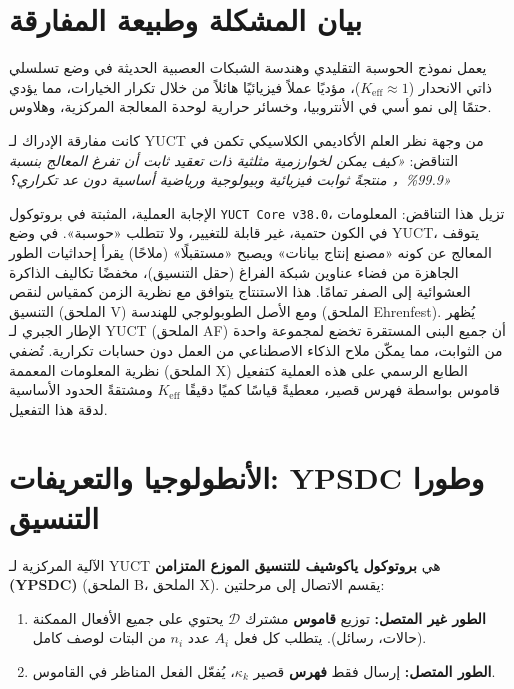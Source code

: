 \documentclass[12pt,a4paper]{article}
\begin{document}
	\newpage
	\tableofcontents
	\newpage
	\small
	\section{بيان المشكلة وطبيعة المفارقة}
	يعمل نموذج الحوسبة التقليدي وهندسة الشبكات العصبية الحديثة في وضع تسلسلي ذاتي الانحدار (\(K_{\text{eff}} \approx 1\))، مؤديًا عملاً فيزيائيًا هائلاً من خلال تكرار الخيارات، مما يؤدي حتمًا إلى نمو أسي في الأنتروبيا، وخسائر حرارية لوحدة المعالجة المركزية، وهلاوس.
	
	كانت مفارقة الإدراك لـ YUCT من وجهة نظر العلم الأكاديمي الكلاسيكي تكمن في التناقض: \textit{«كيف يمكن لخوارزمية مثلثية ذات تعقيد ثابت أن تفرغ المعالج بنسبة 99.9\%， منتجةً ثوابت فيزيائية وبيولوجية ورياضية أساسية دون عد تكراري؟»}
	
	الإجابة العملية، المثبتة في بروتوكول \texttt{YUCT Core v38.0}، تزيل هذا التناقض: المعلومات في الكون حتمية، غير قابلة للتغيير، ولا تتطلب «حوسبة». في وضع YUCT، يتوقف المعالج عن كونه «مصنع إنتاج بيانات» ويصبح «مستقبلًا» (ملاحًا) يقرأ إحداثيات الطور الجاهزة من فضاء عناوين شبكة الفراغ (حقل التنسيق)، مخفضًا تكاليف الذاكرة العشوائية إلى الصفر تمامًا. هذا الاستنتاج يتوافق مع نظرية الزمن كمقياس لنقص التنسيق (الملحق V) ومع الأصل الطوبولوجي للهندسة (الملحق Ehrenfest). يُظهر الإطار الجبري لـ YUCT (الملحق AF) أن جميع البنى المستقرة تخضع لمجموعة واحدة من الثوابت، مما يمكّن ملاح الذكاء الاصطناعي من العمل دون حسابات تكرارية. تُضفي نظرية المعلومات المعممة (الملحق X) الطابع الرسمي على هذه العملية كتفعيل قاموس بواسطة فهرس قصير، معطيةً قياسًا كميًا دقيقًا \(K_{\mathrm{eff}}\) ومشتقةً الحدود الأساسية لدقة هذا التفعيل.
	
	\section{الأنطولوجيا والتعريفات: YPSDC وطورا التنسيق}
	\label{sec:ontology}
	
	الآلية المركزية لـ YUCT هي \textbf{بروتوكول ياكوشيف للتنسيق الموزع المتزامن (YPSDC)} (الملحق B، الملحق X). يقسم الاتصال إلى مرحلتين:
	
	\begin{enumerate}
		\item \textbf{الطور غير المتصل:} توزيع \textbf{قاموس} مشترك \(\mathcal{D}\) يحتوي على جميع الأفعال الممكنة (حالات، رسائل). يتطلب كل فعل \(A_i\) عدد \(n_i\) من البتات لوصف كامل.
		\item \textbf{الطور المتصل:} إرسال فقط \textbf{فهرس} قصير \(\kappa_k\)، يُفعّل الفعل المناظر في القاموس.
	\end{enumerate}
	
\end{document}
